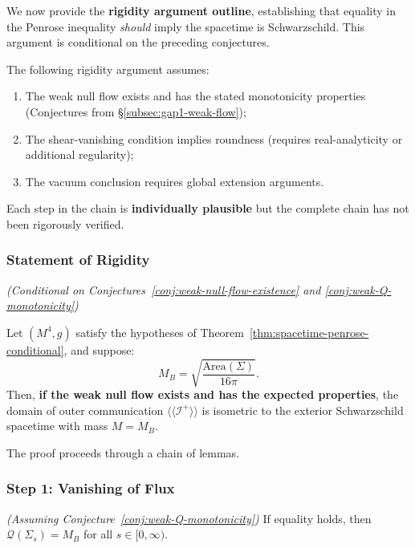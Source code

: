 We now provide the \textbf{rigidity argument outline}, establishing that equality in the Penrose inequality \emph{should} imply the spacetime is Schwarzschild. This argument is conditional on the preceding conjectures.

\begin{remark}
The following rigidity argument assumes:
\begin{enumerate}
\item The weak null flow exists and has the stated monotonicity properties (Conjectures from \S\ref{subsec:gap1-weak-flow});
\item The shear-vanishing condition implies roundness (requires real-analyticity or additional regularity);
\item The vacuum conclusion requires global extension arguments.
\end{enumerate}
Each step in the chain is \textbf{individually plausible} but the complete chain has not been rigorously verified.
\end{remark}

\subsubsection{Statement of Rigidity}

\begin{proposition}
\label{prop:rigidity-outline}
\textit{(Conditional on Conjectures~\ref{conj:weak-null-flow-existence} and \ref{conj:weak-Q-monotonicity})}

Let $(M^4, g)$ satisfy the hypotheses of Theorem~\ref{thm:spacetime-penrose-conditional}, and suppose:
\begin{equation}
M_B = \sqrt{\frac{\mathrm{Area}(\Sigma)}{16\pi}}.
\end{equation}
Then, \textbf{if the weak null flow exists and has the expected properties}, the domain of outer communication $\langle\!\langle \mathscr{I}^+ \rangle\!\rangle$ is isometric to the exterior Schwarzschild spacetime with mass $M = M_B$.
\end{proposition}

The proof proceeds through a chain of lemmas.

\subsubsection{Step 1: Vanishing of Flux}

\begin{lemma}[No Flux]
\label{lem:no-flux}
\textit{(Assuming Conjecture~\ref{conj:weak-Q-monotonicity})}
If equality holds, then $\mathcal{Q}(\Sigma_s) = M_B$ for all $s \in [0, \infty)$.
\end{lemma}

